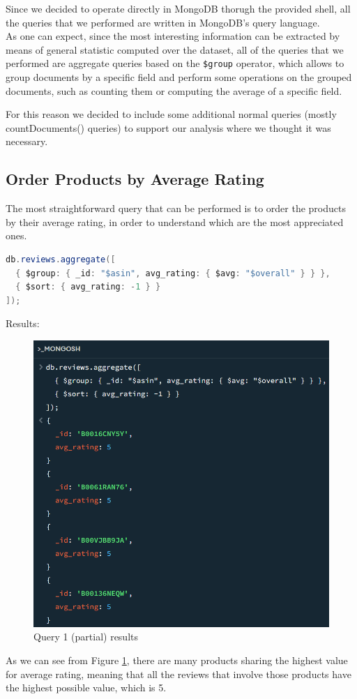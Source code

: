 Since we decided to operate directly in MongoDB thorugh the provided shell, all the queries that we performed are written in MongoDB's query language. \\

As one can expect, since the most interesting information can be extracted by means of general statistic computed over the dataset, all of the queries that we performed are aggregate queries based on the \texttt{\$group} operator, which allows to group documents by a specific field and perform some operations on the grouped documents, such as counting them or computing the average of a specific field.

For this reason we decided to include some additional normal queries (mostly countDocuments() queries) to support our analysis where we thought it was necessary. \\

\newpage
\subsection{Order Products by Average Rating}
The most straightforward query that can be performed is to order the products by their average rating, in order to understand which are the most appreciated ones. \\
\begin{lstlisting}[language=Java]
db.reviews.aggregate([
  { $group: { _id: "$asin", avg_rating: { $avg: "$overall" } } },
  { $sort: { avg_rating: -1 } }
]);
\end{lstlisting}
Results:
\begin{figure}[H]
  \centering
  \includegraphics[scale=0.6]{Images/q1_result.png}
  \caption{Query 1 (partial) results}
  \label{fig:q1_result}
\end{figure}
As we can see from Figure \ref{fig:q1_result}, there are many products sharing the highest value for average rating, meaning that all the reviews that involve those products have the highest possible value, which is 5.\\


